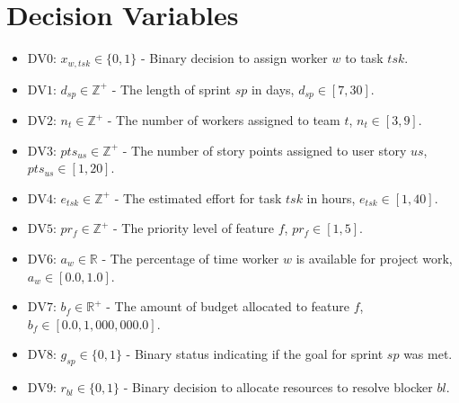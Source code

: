 \documentclass[11pt]{article}
\begin{document}
\section{Decision Variables}
\begin{itemize}
    \item $\text{DV0: } x_{w, tsk} \in \{0, 1\}$ - Binary decision to assign worker $w$ to task $tsk$.
    \item $\text{DV1: } d_{sp} \in \mathbb{Z}^+$ - The length of sprint $sp$ in days, $d_{sp} \in [7, 30]$.
    \item $\text{DV2: } n_t \in \mathbb{Z}^+$ - The number of workers assigned to team $t$, $n_t \in [3, 9]$.
    \item $\text{DV3: } pts_{us} \in \mathbb{Z}^+$ - The number of story points assigned to user story $us$, $pts_{us} \in [1, 20]$.
    \item $\text{DV4: } e_{tsk} \in \mathbb{Z}^+$ - The estimated effort for task $tsk$ in hours, $e_{tsk} \in [1, 40]$.
    \item $\text{DV5: } pr_f \in \mathbb{Z}^+$ - The priority level of feature $f$, $pr_f \in [1, 5]$.
    \item $\text{DV6: } a_w \in \mathbb{R}$ - The percentage of time worker $w$ is available for project work, $a_w \in [0.0, 1.0]$.
    \item $\text{DV7: } b_f \in \mathbb{R}^+$ - The amount of budget allocated to feature $f$, $b_f \in [0.0, 1,000,000.0]$.
    \item $\text{DV8: } g_{sp} \in \{0, 1\}$ - Binary status indicating if the goal for sprint $sp$ was met.
    \item $\text{DV9: } r_{bl} \in \{0, 1\}$ - Binary decision to allocate resources to resolve blocker $bl$.
\end{itemize}
\end{document}
